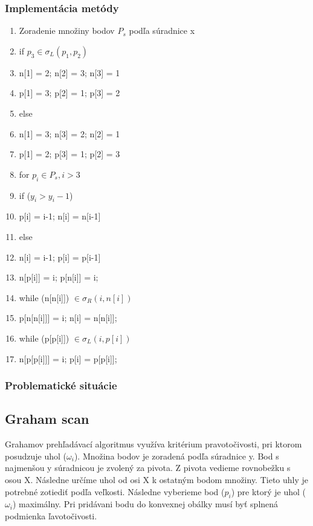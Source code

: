 \documentclass[12pt]{article}
\begin{document}
\subsubsection{Implementácia metódy}
\begin{enumerate}
	\item  Zoradenie množiny bodov $P_s$ podľa súradnice x
	\item if $p_3 \in \sigma_L (p_1, p_2)$
	\item \hspace {1.5cm} n[1] = 2; n[2] = 3; n[3] = 1
	\item \hspace {1.5cm} p[1] = 3; p[2] = 1; p[3] = 2
	\item else
	\item \hspace {1.5cm} n[1] = 3; n[3] = 2; n[2] = 1
	\item \hspace {1.5cm} p[1] = 2; p[3] = 1; p[2] = 3
	\item for $p_i \in P_s, i > 3$
	\item \hspace {1.5cm} if ($y_i>y_i-1$) 
	\item \hspace {2.5cm} p[i] = i-1; n[i] = n[i-1]
	\item \hspace {1.5cm} else 
	\item \hspace {2.5cm} n[i] = i-1; p[i] = p[i-1]
	\item \hspace {1.5cm}n[p[i]] = i; p[n[i]] = i;
	\item \hspace {1.5cm}while (n[n[i]]) $\in \sigma_R (i, n[i]) $
	\item \hspace {2.5cm} p[n[n[i]]] = i; n[i] = n[n[i]];
	\item \hspace {1.5cm} while (p[p[i]]) $\in \sigma_L (i, p[i]) $
	\item \hspace {2.5cm} n[p[p[i]]] = i; p[i] = p[p[i]];
\end{enumerate}
\subsubsection{Problematické situácie}

\subsection {Graham scan}
Grahamov prehľadávací algoritmus využíva kritérium pravotočivosti, pri ktorom posudzuje uhol  ($\omega_i$). Množina bodov je zoradená podľa súradnice y. Bod s najmenšou y súradnicou je zvolený za pivota. Z pivota vedieme rovnobežku s osou X. Následne určíme uhol od osi X k ostatným bodom množiny. Tieto uhly je potrebné zotiediť podľa veľkosti. Následne vyberieme bod  ($p_i$) pre ktorý je uhol  ($\omega_i$) maximálny. Pri pridávani bodu do konvexnej obálky musí byť splnená podmienka ľavotočivosti.
\end{document}
